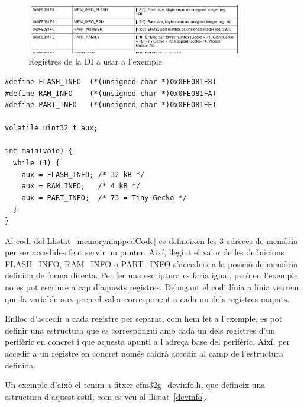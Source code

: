 \begin{figure}
 \centering
 \includegraphics[width=0.85\textwidth, keepaspectratio]{imatges/DI_Table_RM.png}
 \caption{Registres de la DI a usar a l'exemple \cite[24]{EFM32GRM}}
 \label{fig:EFM32_DI}
\end{figure}



\begin{lstlisting}[frame=single,caption={Accedint a memòria en C},label=memorymappedCode,style=customc]
#define FLASH_INFO  (*(unsigned char *)0x0FE081F8)
#define RAM_INFO    (*(unsigned char *)0x0FE081FA)
#define PART_INFO   (*(unsigned char *)0x0FE081FE)

volatile uint32_t aux;

int main(void) {
  while (1) {
    aux = FLASH_INFO; /* 32 kB */
    aux = RAM_INFO;   /* 4 kB */
    aux = PART_INFO;  /* 73 = Tiny Gecko */
  }
}
\end{lstlisting}

Al codi del Llistat~\ref{memorymappedCode} es defineixen les 3 adreces de memòria per ser accedides fent servir un punter. Així, llegint el valor de les definicions FLASH\_INFO, RAM\_INFO o PART\_INFO s’accedeix a la posició de memòria definida de forma directa. Per fer una escriptura es faria igual, però en l'exemple no es pot escriure a cap d'aquests registres. Debugant el codi línia a línia veurem que la variable aux pren el valor corresponent a cada un dels registres mapats.

Enlloc d'accedir a cada registre per separat, com hem fet a l'exemple, es pot definir una estructura que es correspongui amb cada un dels registres d’un perifèric en concret i que aquesta apunti a l'adreça base del perifèric. Així, per accedir a un registre en concret només caldrà accedir al camp de l'estructura definida.

Un exemple d'això el tenim a fitxer efm32g\_devinfo.h, que defineix
una estructura d'aquest estil, com es veu al llistat~\ref {devinfo}.

